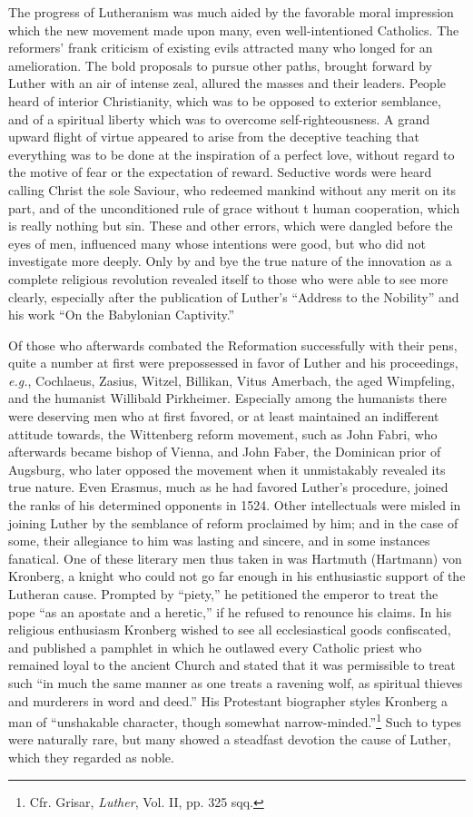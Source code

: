 The progress of Lutheranism was much aided by the favorable
moral impression which the new movement made upon many, even
well-intentioned Catholics. The reformers’ frank criticism of existing
evils attracted many who longed for an amelioration. The bold
proposals to pursue other paths, brought forward by Luther with an
air of intense zeal, allured the masses and their leaders. People heard
of interior Christianity, which was to be opposed to exterior semblance,
and of a spiritual liberty which was to overcome self-righteousness. A grand
upward flight of virtue appeared to arise from
the deceptive teaching that everything was to be done at the
inspiration of a perfect love, without regard to the motive of
fear or the expectation of reward. Seductive words were heard
calling Christ the sole Saviour, who redeemed mankind without any
merit on its part, and of the unconditioned rule of grace without
t human cooperation, which is really nothing but sin. These
and other errors, which were dangled before the eyes of men, influenced many whose
intentions were good, but who did not investigate more deeply. Only
by and bye the true nature of the innovation as a complete religious
revolution revealed itself to those who were able to see more clearly,
especially after the publication of Luther’s “Address to the Nobility”
and his work “On the Babylonian Captivity.”

Of those who afterwards combated the Reformation successfully
with their pens, quite a number at first were prepossessed in favor of
Luther and his proceedings, \textit{e.g.}, Cochlaeus, Zasius, Witzel, Billikan,
Vitus Amerbach, the aged Wimpfeling, and the humanist Willibald
Pirkheimer. Especially among the humanists there were deserving
men who at first favored, or at least maintained an indifferent attitude
towards, the Wittenberg reform movement, such as John Fabri,
who afterwards became bishop of Vienna, and John Faber, the Dominican prior
of Augsburg, who later opposed the movement when
it unmistakably revealed its true nature. Even Erasmus, much as he
had favored Luther’s procedure, joined the ranks of his determined
opponents in 1524. Other intellectuals were misled in joining Luther
by the semblance of reform proclaimed by him; and in the case of
some, their allegiance to him was lasting and sincere, and in some instances
fanatical. One of these literary men thus taken in was
Hartmuth (Hartmann) von Kronberg, a knight who could not go far
enough in his enthusiastic support of the Lutheran cause. Prompted
by “piety,” he petitioned the emperor to treat the pope “as an apostate
and a heretic,” if he refused to renounce his claims. In his religious
enthusiasm Kronberg wished to see all ecclesiastical goods
confiscated, and published a pamphlet in which he outlawed every
Catholic priest who remained loyal to the ancient Church and stated
that it was permissible to treat such “in much the same manner
as one treats a ravening wolf, as spiritual thieves and murderers in
word and deed.” His Protestant biographer styles Kronberg a man of
“unshakable character, though somewhat narrow-minded.”\footnote
{Cfr. Grisar, \textit{Luther}, Vol. II, pp. 325 sqq.}
Such to types were naturally rare, but many showed a steadfast devotion
the cause of Luther, which they regarded as noble.

